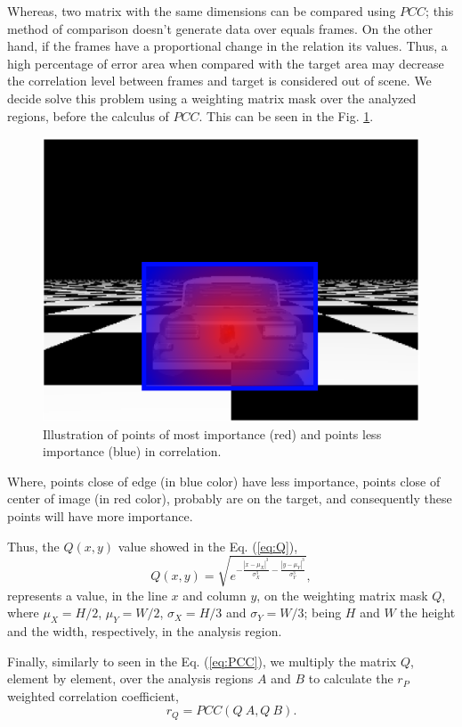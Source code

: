 Whereas, two matrix with the same dimensions can be compared using $PCC$; 
this method of comparison doesn't generate data over equals frames.
On the other hand, if the frames have a proportional change in the relation its values. 
Thus, a high percentage of error area when compared with the target area 
may decrease the correlation level between frames and target is considered out of scene. 
We decide solve this problem using a weighting matrix mask over the analyzed regions, 
before the calculus of $PCC$. This can be seen in the Fig. \ref{fig:errorpondered}.
\begin{figure}[H]
\includegraphics[width=\columnwidth]{images/imageErrorcontroled.eps}
\caption{Illustration of points of most importance (red) and points less importance (blue) in correlation.}
\label{fig:errorpondered}
\end{figure}
Where, points close of edge (in blue color) have less importance, 
points close of center of image (in red color), probably are on the target, and consequently
these points will have more importance. 

Thus, the $Q(x,y)$ value showed in the Eq. (\ref{eq:Q}), 
\begin{equation}\label{eq:Q}
 Q(x,y) = \sqrt{e^{ -\frac{|x-\mu_X|^3}{\sigma_X^3}-\frac{|y-\mu_Y|^3}{\sigma_Y^3}  }},
\end{equation}
represents a value, in the line $x$ and column $y$, on the weighting matrix mask $Q$,
where $\mu_X=H/2$, $\mu_Y=W/2$, $\sigma_X=H/3$ and $\sigma_Y=W/3$; being $H$ and $W$
the height and the width, respectively, in the analysis region.

Finally, similarly to seen in the Eq. (\ref{eq:PCC}), we multiply the matrix $Q$, 
element by element, over the analysis regions
$A$ and $B$ to calculate the $r_P$ weighted correlation coefficient, 
\begin{equation}\label{eq:rw}
 r_Q = PCC(Q~A, Q~B).
\end{equation}



